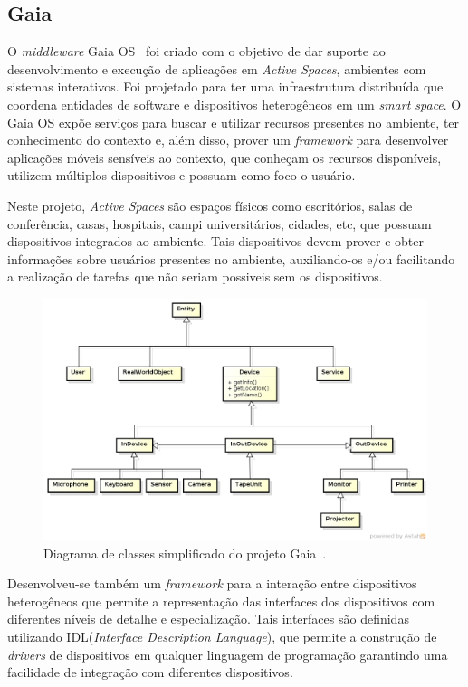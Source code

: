 \subsection{Gaia}
O \emph{middleware} Gaia OS~\cite{gaia2002} foi criado com o objetivo de dar suporte ao desenvolvimento e execução de aplicações em \emph{Active Spaces}, ambientes com sistemas interativos. Foi projetado para ter uma infraestrutura distribuída que coordena entidades de software e dispositivos heterogêneos em um \emph{smart space}. O Gaia OS expõe serviços para buscar e utilizar recursos presentes no ambiente, ter conhecimento do contexto e, além disso, prover um \emph{framework} para desenvolver aplicações móveis sensíveis ao contexto, que conheçam os recursos disponíveis, utilizem múltiplos dispositivos e possuam como foco o usuário.

Neste projeto, \emph{Active Spaces} são espaços físicos como escritórios, salas de conferência, casas, hospitais, campi universitários, cidades, etc, que possuam dispositivos integrados ao ambiente. Tais dispositivos devem prover e obter informações sobre usuários presentes no ambiente, auxiliando-os e/ou facilitando a realização de tarefas que não seriam possiveis sem os dispositivos.

\begin{figure}[ht]
\center
\includegraphics[scale=0.5]{imagens/gaia-devices}
\caption{Diagrama de classes simplificado do projeto Gaia~\cite{gaiaDevices}.}
\label{fig:gaiaClassDiagram}
\end{figure}

Desenvolveu-se também um \emph{framework} para a interação entre dispositivos heterogêneos que permite a representação das interfaces dos dispositivos com diferentes níveis de detalhe e especialização. Tais interfaces são definidas utilizando IDL(\emph{Interface Description Language}), que permite a construção de \emph{drivers} de dispositivos em qualquer linguagem de programação garantindo uma facilidade de integração com diferentes dispositivos.

